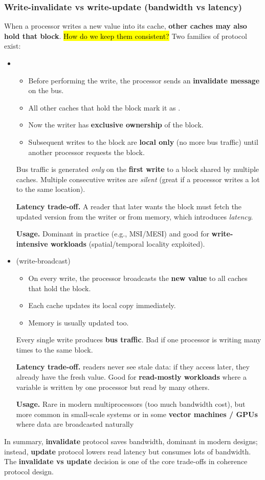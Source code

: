 \subsubsection{Write-invalidate vs write-update (bandwidth vs latency)}

When a processor writes a new value into its cache, \textbf{other caches may also hold that block}. \hl{How do we keep them consistent?} Two families of protocol exist:
\begin{itemize}
    \item {}
    \begin{itemize}
        \item Before performing the write, the processor sends an \textbf{invalidate message} on the bus.
        \item All other caches that hold the block mark it as .
        \item Now the writer has \textbf{exclusive ownership} of the block.
        \item Subsequent writes to the block are \textbf{local only} (no more bus traffic) until another processor requests the block.
    \end{itemize}
    Bus traffic is generated \emph{only} on the \textbf{first write} to a block shared by multiple caches. Multiple consecutive writes are \emph{silent} (great if a processor writes a lot to the same location).

    \textcolor{Red2}{ \textbf{Latency trade-off.}} A reader that later wants the block must fetch the updated version from the writer or from memory, which introduces \emph{latency}.

    \textcolor{Green3}{ \textbf{Usage.}} Dominant in practice (e.g., MSI/MESI) and good for \textbf{write-intensive workloads} (spatial/temporal locality exploited).

    
    \item {} (write-broadcast)
    \begin{itemize}
        \item On every write, the processor broadcasts the \textbf{new value} to all caches that hold the block.
        \item Each cache updates its local copy immediately.
        \item Memory is usually updated too.
    \end{itemize}
    Every single write produces \textbf{bus traffic}. Bad if one processor is writing many times to the same block.

    \textcolor{Red2}{ \textbf{Latency trade-off.}} readers never see stale data: if they access later, they already have the fresh value. Good for \textbf{read-mostly workloads} where a variable is written by one processor but read by many others.

    \textcolor{Green3}{ \textbf{Usage.}} Rare in modern multiprocessors (too much bandwidth cost), but more common in small-scale systems or in some \textbf{vector machines / GPUs} where data are broadcasted naturally
\end{itemize}
In summary, \textbf{invalidate} protocol saves bandwidth, dominant in modern designs; instead, \textbf{update} protocol lowers read latency but consumes lots of bandwidth. The \textbf{invalidate vs update} decision is one of the core trade-offs in coherence protocol design.